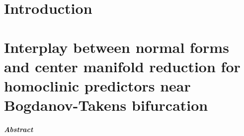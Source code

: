 \documentclass[twoside]{report}
\begin{document}
\newif\ifsiam
\siamfalse
\siamtrue

\newif\ifarxiv
\arxivtrue
\arxivfalse

\newif\ifcompileimages%
\compileimagestrue%
\compileimagesfalse%



\newif\ifthesis
\thesistrue

\def\ignore#1{}
\def\use#1{#1}

\ifthesis
    \let\process=\use
\else
    \let\process=\ignore
\fi


{\hypersetup{linkcolor=siamblue} \tableofcontents }

\chapter{Introduction}


\chapter[BT normal forms and center manifold reduction]
        {Interplay between normal forms and center manifold reduction for homoclinic predictors near Bogdanov-Takens bifurcation}
\label{chapter:interplay}
\newcommand\imagesdir{./images/btinterplay}
\newcommand\datadir{./data/btinterplay}
\paragraph{{\color{header1}Abstract}}








\begin{subappendices}




\end{subappendices}

\renewcommand\tikzdir{tikz/switching}
\renewcommand\imagedir{images/switching}
\end{document}
